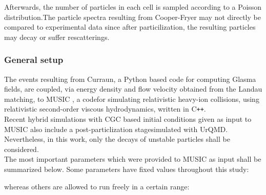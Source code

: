 Afterwards, the number of particles in each cell is sampled according to a Poisson distribution.The particle spectra resulting from Cooper-Fryer may not directly be compared to experimental data since after particilization, the resulting particles may decay or suffer rescatterings. 

\subsubsection*{General setup}
The events resulting from {\sffamily Curraun}, a {\sffamily Python} based code for computing Glasma fields, are coupled, via energy density and flow velocity obtained from the Landau matching, to {\sffamily MUSIC} \cite{paquetbulk, schenkemusic1, schenkemusic2}, a codefor simulating relativistic heavy-ion collisions, using relativistic second-order viscous hydrodynamics, written in {\sffamily C}\texttt{++}. \\

Recent hybrid simulations with {\sffamily CGC} based initial conditions given as input to {\sffamily MUSIC} also include a post-particlization stagesimulated with {\sffamily UrQMD}. Nevertheless, in this work, only the decays of unstable particles shall be considered. \\

The most important parameters which were provided to {\sffamily MUSIC} as input shall be summarized below. Some parameters have fixed values throughout this study:

\vspace{0.5cm}

whereas others are allowed to run freely in a certain range:

